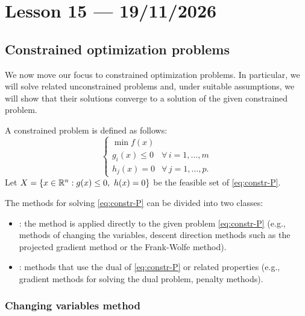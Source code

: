 \section{Lesson 15 --- 19/11/2026}

\subsection{Constrained optimization problems}

We now move our focus to constrained optimization problems. In particular, we will solve related unconstrained problems and, under suitable assumptions, we will show that their solutions converge to a solution of the given constrained problem.

A constrained problem is defined as follows:
\begin{equation}\label{eq:constr-P}
\begin{cases}
\min f(x)\\
g_i(x) \le 0 & \forall\, i=1,\dots,m\\
h_j(x) = 0 & \forall\, j=1,\dots,p.
\end{cases}
\tag{P}
\end{equation}
Let $X = \{x \in \mathbb{R}^n : g(x) \le 0,\ h(x) = 0\}$ be the feasible set of \eqref{eq:constr-P}.

The methods for solving \eqref{eq:constr-P} can be divided into two classes:
\begin{itemize}
    \item {}: the method is applied directly to the given problem \eqref{eq:constr-P} (e.g., methods of changing the variables, descent direction methods such as the projected gradient method or the Frank-Wolfe method).
    \item {}: methods that use the dual of \eqref{eq:constr-P} or related properties (e.g., gradient methods for solving the dual problem, penalty methods).
\end{itemize}

\subsubsection{Changing variables method}

